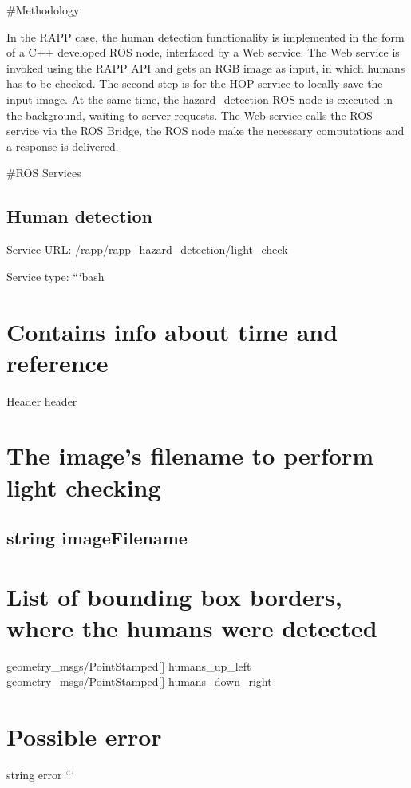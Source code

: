 \#\-Methodology

In the R\-A\-P\-P case, the human detection functionality is implemented in the form of a C++ developed R\-O\-S node, interfaced by a Web service. The Web service is invoked using the R\-A\-P\-P A\-P\-I and gets an R\-G\-B image as input, in which humans has to be checked. The second step is for the H\-O\-P service to locally save the input image. At the same time, the hazard\-\_\-detection R\-O\-S node is executed in the background, waiting to server requests. The Web service calls the R\-O\-S service via the R\-O\-S Bridge, the R\-O\-S node make the necessary computations and a response is delivered.

\#\-R\-O\-S Services

\subsection*{Human detection}

Service U\-R\-L\-: {\ttfamily /rapp/rapp\-\_\-hazard\-\_\-detection/light\-\_\-check}

Service type\-: ```bash \section*{Contains info about time and reference}

Header header \section*{The image's filename to perform light checking}

\subsection*{string image\-Filename }

\section*{List of bounding box borders, where the humans were detected}

geometry\-\_\-msgs/\-Point\-Stamped\mbox{[}\mbox{]} humans\-\_\-up\-\_\-left geometry\-\_\-msgs/\-Point\-Stamped\mbox{[}\mbox{]} humans\-\_\-down\-\_\-right \section*{Possible error}

string error ```

